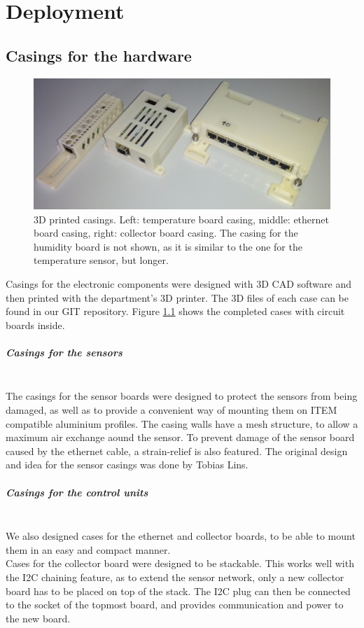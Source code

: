 \documentclass[a4paper]{scrreprt}
\begin{document}
\chapter{Deployment}
\section{Casings for the hardware}
\begin{figure}
	\centering
	\includegraphics[width=\textwidth]{img/cases.jpg}
  \caption{3D printed casings. Left: temperature board casing, middle: ethernet board casing, right: collector board casing. The casing for the humidity board is not shown, as it is similar to the one for the temperature sensor, but longer.}
	\label{fig:casings}
\end{figure}
Casings for the electronic components were designed with 3D CAD software and then printed with the department's 3D printer. The 3D
files of each case can be found in our GIT repository. Figure \ref{fig:casings} shows the completed cases with circuit boards inside.
\paragraph{Casings for the sensors}\hspace{1cm}\\
The casings for the sensor boards were designed to protect the sensors from being damaged, as well as to provide a convenient way of
mounting them on ITEM compatible aluminium profiles. The casing walls have a mesh structure, to allow a maximum air exchange aound the
sensor. To prevent damage of the sensor board caused by the ethernet cable, a strain-relief is also featured. The original design and
idea for the sensor casings was done by Tobias Lins.
\paragraph{Casings for the control units}\hspace{1cm}\\
We also designed cases for the ethernet and collector boards, to be able to mount them in an easy and compact manner.\\
Cases for the collector board were designed to be stackable. This works well with the I2C chaining feature, as to extend the sensor network,
only a new collector board has to be placed on top of the stack. The I2C plug can then be connected to the socket of the topmost board, and provides
communication and power to the new board.
\end{document}
